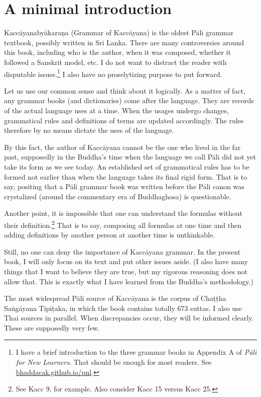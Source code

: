 \cleardoublepage
{}
{}
\chapter*{A minimal introduction}

Kaccāyanabyākaraṇa (Grammar of Kaccāyana) is the oldest Pāli grammar textbook, possibly written in Sri Lanka. There are many controversies around this book, including who is the author, when it was composed, whether it followed a Sanskrit model, etc. I do not want to distract the reader with disputable issues.\footnote{I have a brief introduction to the three grammar books in Appendix A of \emph{Pāli for New Learners}. That should be enough for most readers. See \url{bhaddacak.github.io/pnl}.} I also have no proselytizing purpose to put forward.

Let us use our common sense and think about it logically. As a matter of fact, any grammar books (and dictionaries) come after the language. They are records of the actual language uses at a time. When the usages undergo changes, grammatical rules and definitions of terms are updated accordingly. The rules therefore by no means dictate the uses of the language.

By this fact, the author of Kaccāyana cannot be the one who lived in the far past, supposedly in the Buddha's time when the language we call Pāli did not yet take its form as we see today. An established set of grammatical rules has to be formed not earlier than when the language takes its final rigid form. That is to say, positing that a Pāli grammar book was written before the Pāli canon was crystalized (around the commentary era of Buddhaghosa) is questionable.

Another point, it is impossible that one can understand the formulas without their definition.\footnote{See Kacc 9, for example. Also consider Kacc 15 versus Kacc 25.} That is to say, composing all formulas at one time and then adding definitions by another person at another time is unthinkable.

Still, no one can deny the importance of Kaccāyana grammar. In the present book, I will only focus on its text and put other issues aside. (I also have many things that I want to believe they are true, but my rigorous reasoning does not allow that. This is exactly what I have learned from the Buddha's methodology.) 

The most widespread Pāli source of Kaccāyana is the corpus of Chaṭṭha Saṅgāyana Tipiṭaka, in which the book contains totally 673 suttas. I also use Thai sources in parallel. When discrepancies occur, they will be informed clearly. These are supposedly very few.

